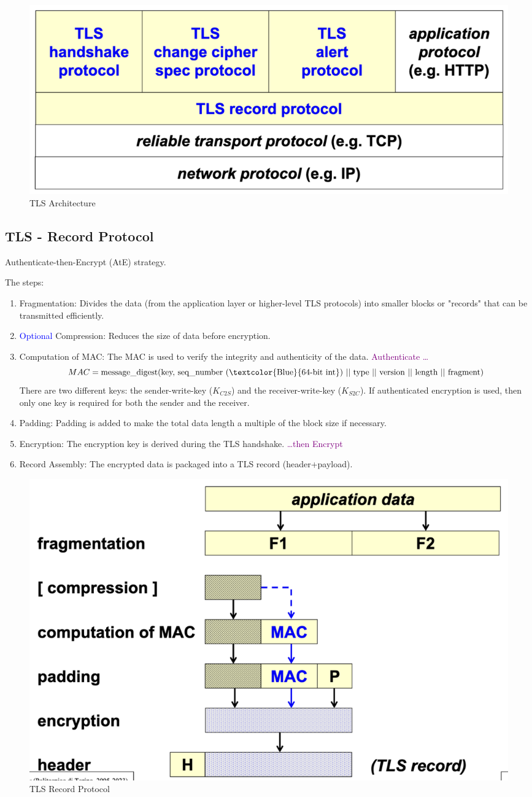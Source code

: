 \begin{figure}[H]
    \centering
    \includegraphics[width=0.5\linewidth]{Images/Appsec/tls_arch.png}
    \caption{TLS Architecture}
\end{figure}

\subsection{TLS - Record Protocol}
\begin{center}
    Authenticate-then-Encrypt (AtE) strategy.
\end{center}
The steps:

\begin{enumerate}
    \item Fragmentation: Divides the data (from the application layer or higher-level TLS protocols) into smaller blocks or "records" that can be transmitted efficiently.
    \item \textcolor{blue}{Optional} Compression: Reduces the size of data before encryption.
    \item Computation of MAC: The MAC is used to verify the integrity and authenticity of the data. \textcolor{Purple}{Authenticate \dots}
    \[
        MAC=\text{message\_digest(key, seq\_number (\textcolor{Blue}{64-bit int}) || type || version || length || fragment)}
    \]
    There are two different keys: the sender-write-key ($K_{C2S}$) and the receiver-write-key ($K_{S2C}$). If authenticated encryption is used, then only one key is required for both the sender and the receiver.

    \item Padding: Padding is added to make the total data length a multiple of the block size if necessary.
    \item Encryption: The encryption key is derived during the TLS handshake. \textcolor{Purple}{\dots then Encrypt}
    \item Record Assembly: The encrypted data is packaged into a TLS record (header+payload).
\end{enumerate}

\begin{figure}[H]
    \centering
    \includegraphics[width=0.5\linewidth]{Images/Appsec/record_protocol.png}
    \caption{TLS Record Protocol}
\end{figure}

